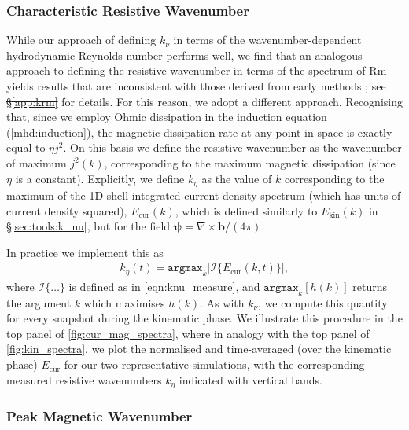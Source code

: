 \documentclass[12pt,twoside]{extreport}
\makeatletter
\newcommand{\mVector}[1]{\bm{#1}} %
\newcommand{\mRem}{\ensuremath{\mathrm{Rm}}} %
\providecommand{\DIFaddtex}[1]{{\protect\color{DIFgreen}\uwave{#1}}} %
\providecommand{\DIFdeltex}[1]{{\protect\color{DIFpurple}\sout{#1}}} %
\providecommand{\DIFaddbegin}{} %
\providecommand{\DIFaddend}{} %
\providecommand{\DIFdelbegin}{} %
\providecommand{\DIFdelend}{} %
\providecommand{\DIFadd}[1]{\texorpdfstring{\DIFaddtex{#1}}{#1}} %
\providecommand{\DIFdel}[1]{\texorpdfstring{\DIFdeltex{#1}}{}} %
\providecommand{\DIFscaledelfig}{0.5}
\newlength{\DIFdelgraphicswidth} %
\newlength{\DIFdelgraphicsheight} %
\providecommand{\DIFaddincludegraphics}[2][]{{\color{DIFgreen}\fbox{\DIFOincludegraphics[#1]{#2}}}} %
\providecommand{\DIFdelincludegraphics}[2][]{%
\sbox{\DIFdelgraphicsbox}{\DIFOincludegraphics[#1]{#2}}%
\settoboxwidth{\DIFdelgraphicswidth}{\DIFdelgraphicsbox} %
\settoboxtotalheight{\DIFdelgraphicsheight}{\DIFdelgraphicsbox} %
\scalebox{\DIFscaledelfig}{%
\parbox[b]{\DIFdelgraphicswidth}{\usebox{\DIFdelgraphicsbox}\\[-\baselineskip] \rule{\DIFdelgraphicswidth}{0em}}\llap{\resizebox{\DIFdelgraphicswidth}{\DIFdelgraphicsheight}{%
\setlength{\unitlength}{\DIFdelgraphicswidth}%
\begin{picture}(1,1)%
\thicklines\linethickness{2pt} %
{\color{DIFpurple}\put(0,0){\framebox(1,1){}}}%
{\color{DIFpurple}\put(0,0){\line( 1,1){1}}}%
{\color{DIFpurple}\put(0,1){\line(1,-1){1}}}%
\end{picture}%
}\hspace*{3pt}}} %
} %
\DeclareRobustCommand{\DIFaddbegin}{\DIFOaddbegin \let\includegraphics\DIFaddincludegraphics} %
\DeclareRobustCommand{\DIFaddend}{\DIFOaddend \let\includegraphics\DIFOincludegraphics} %
\DeclareRobustCommand{\DIFdelbegin}{\DIFOdelbegin \let\includegraphics\DIFdelincludegraphics} %
\DeclareRobustCommand{\DIFdelend}{\DIFOaddend \let\includegraphics\DIFOincludegraphics} %
\let\sout@orig\sout %
\renewcommand{\sout}[1]{\ifmmode\text{\sout@orig{\ensuremath{#1}}}\else\sout@orig{#1}\fi} %
\makeatother
\begin{document}
\subsubsection{Characteristic Resistive Wavenumber}
\label{sec:tools:k_eta}

While our approach of defining $k_\nu$ in terms of the wavenumber-dependent hydrodynamic Reynolds number performs well, we find that an analogous approach to defining the resistive wavenumber in terms of the spectrum of $\mRem$ yields results that are inconsistent with those derived from early methods \citep{kulsrud1992spectrum, kriel2022fundamental, brandenburg2023dissipative}; see \DIFdelbegin \DIFdel{\S\ref{app:krm} }\DIFdelend \DIFaddbegin \DIFadd{End Matter (\S\ref{app:krm}) }\DIFaddend for details. For this reason, we adopt a different approach. Recognising that, since we employ Ohmic dissipation in the induction equation (\autoref{mhd:induction}), the magnetic dissipation rate at any point in space is exactly equal to $\eta j^2$. On this basis we define the resistive wavenumber as the wavenumber of maximum $j^2(k)$, corresponding to the maximum magnetic dissipation (since $\eta$ is a constant). Explicitly, we define $k_\eta$ as the value of $k$ corresponding to the maximum of the 1D shell-integrated current density spectrum (which has units of current density squared), $E_\mathrm{cur}(k)$, which is defined similarly to $E_\mathrm{kin}(k)$ in \S\ref{sec:tools:k_nu}, but for the field $\mVector{\psi} = \nabla\times\mVector{b} / (4\pi)$.

In practice we implement this as
\begin{align}
    k_\eta(t)
        = \texttt{argmax}_k\Big[
            \mathcal{I}\Big\{ E_\mathrm{cur}(k, t) \Big\}
        \Big]
        , \label{eqn:keta_measure}
\end{align}
where $\mathcal{I}\{\dots\}$ is defined as in \autoref{eqn:knu_measure}, and $\texttt{argmax}_k[h(k)]$ returns the argument $k$ which maximises $h(k)$. As with $k_\nu$, we compute this quantity for every snapshot during the kinematic phase. We illustrate this procedure in the top panel of \autoref{fig:cur_mag_spectra}, where in analogy with the top panel of \autoref{fig:kin_spectra}, we plot the normalised and time-averaged (over the kinematic phase) $E_\mathrm{cur}$ for our two representative simulations, with the corresponding measured resistive wavenumbers $k_\eta$ indicated with vertical bands.

\subsubsection{Peak Magnetic Wavenumber}
\label{sec:tools:k_p}
\end{document}
